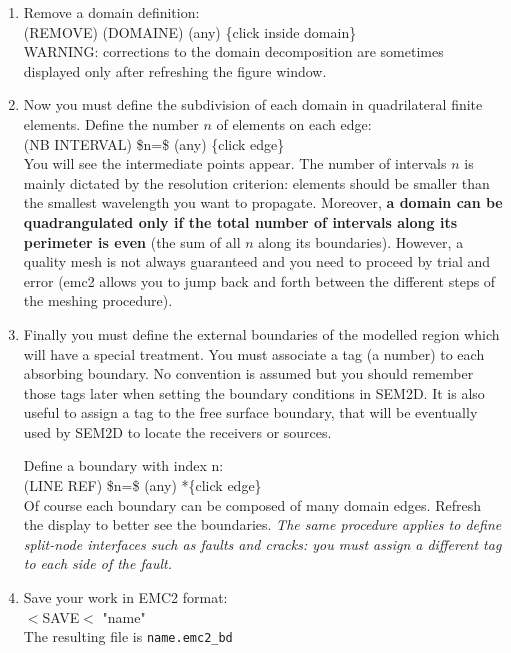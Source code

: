 \begin{enumerate}[STEP I:]
\begin{enumerate}[1.]
  \item Remove a domain definition:\\
	\textsf{(REMOVE) (DOMAINE) (any) \{click inside domain\}}\\
   WARNING: corrections to the domain decomposition are
   sometimes displayed only after refreshing the figure window.

  \item Now you must define the subdivision of each 
   domain in quadrilateral finite elements. 
   Define the number $n$ of elements on each edge:\\
	\textsf{(NB INTERVAL) \$n=\$ (any) \{click edge\} }\\
   You will see the intermediate points appear.
   The number of intervals $n$ is mainly dictated by the resolution criterion: 
   elements should be smaller than the smallest wavelength you want to propagate.
   Moreover, {\bf a domain can be quadrangulated only if
   the total number of intervals along its perimeter is even} 
   (the sum of all $n$ along its boundaries).
   However, a quality mesh is not always guaranteed
   and you need to proceed by trial and error (emc2 allows you
   to jump back and forth between the different steps of the
   meshing procedure).

\item Finally you must define the external boundaries of 
the modelled region which will have a special treatment.
You must associate a tag (a number) to each absorbing boundary.
No convention is assumed but you should remember those tags later
when setting the boundary conditions in SEM2D. It is also useful
to assign a tag to the free surface boundary, that will be eventually
used by SEM2D to locate the receivers or sources.

   Define a boundary with index n:\\
	\textsf{(LINE REF) \$n=\$ (any) *\{click edge\}}\\ 
   Of course each boundary can be composed of many 
   domain edges.
   Refresh the display to better see the boundaries.
   \emph{The same procedure applies to define split-node interfaces such as faults and cracks: 
   you must assign a different tag to each side of the fault.}

  \item Save your work in EMC2 format: \\
	\textsf{$<$SAVE$<$ "name"}\\
   The resulting file is \texttt{name.emc2\_bd}
   

\end{enumerate}
\end{enumerate}
